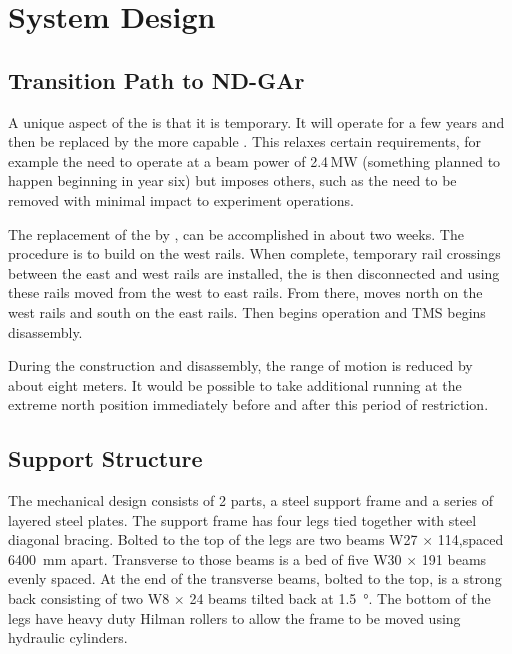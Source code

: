\section{System Design}
\label{sec:tms-des}

\subsection{Transition Path to ND-GAr}
\label{sec:tms-des-path}


A unique aspect of the 
is that it is temporary. It will operate for a few
years and then be replaced by the more capable 
. This relaxes certain requirements,
for example the need to operate at a beam power of 2.4\,MW (something planned to happen beginning in year six) but imposes others, such as the need
to be removed with minimal impact to experiment
operations.

The replacement of the  by , can be
accomplished in about two weeks. The procedure is
to build  on the west  rails. When
complete, temporary rail crossings between
the  east and west rails are installed,
the  is then disconnected and using these
rails moved from the west to east rails. From
there,  moves north on the west rails and
 south on the east rails. Then
 begins operation and TMS begins
disassembly.

During the  construction and  disassembly, the
 range of motion is reduced by about eight meters. It
would be possible to take additional running at the extreme
north position immediately before and after this period of restriction.

\subsection{Support Structure}
\label{sec:tms-des-structure}
The mechanical design consists of 2 parts, a steel support frame and a series of layered steel plates.  The support frame has four legs tied together with steel diagonal bracing. Bolted to the top of the legs are two beams W27 $\times$ 114,spaced \SI{6400}{\mm} apart. Transverse to those beams is a bed of five W30 $\times$ 191 beams evenly spaced. At the end of the transverse beams, bolted to the top, is a strong back consisting of two W8 $\times$ 24 beams tilted back at \SI{1.5}{\degree}. The bottom of the legs have heavy duty Hilman rollers to allow the frame to be moved using hydraulic cylinders.

